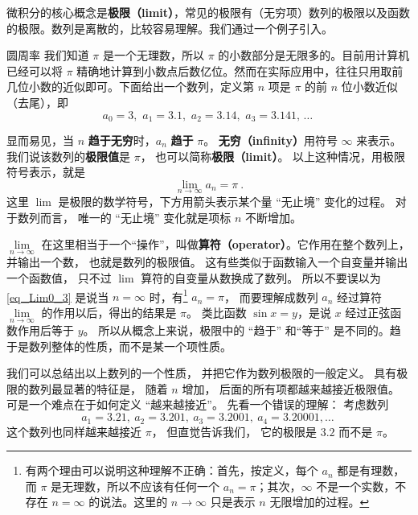 
微积分的核心概念是\textbf{极限（limit）}，常见的极限有（无穷项）数列的极限以及函数的极限。数列是离散的，比较容易理解。我们通过一个例子引入。

\begin{example}{圆周率}\label{ex_Lim0_1}
我们知道 $\pi$ 是一个无理数，所以 $\pi$ 的小数部分是无限多的。目前用计算机已经可以将 $\pi$ 精确地计算到小数点后数亿位。然而在实际应用中，往往只用取前几位小数的近似即可。下面给出一个数列，定义第 $n$ 项是 $\pi$ 的前 $n$ 位小数近似（去尾），即
\begin{equation}\label{eq_Lim0_1}
a_0 = 3,\,\, a_1 = 3.1,\,\, a_2 = 3.14,\,\, a_3 = 3.141,\,\dots~
\end{equation}

显而易见，当 $n$ \textbf{趋于无穷}时，$a_n$ \textbf{趋于} $\pi$。 \textbf{无穷（infinity）}用符号 $\infty$ 来表示。 我们说该数列的\textbf{极限值}是 $\pi$， 也可以简称\textbf{极限（limit）}。 以上这种情况，用极限符号表示，就是
\begin{equation}\label{eq_Lim0_3}
\lim_{n \to \infty } {a_n} = \pi ~.
\end{equation}
这里 $\lim$ 是极限的数学符号，下方用箭头表示某个量 “无止境” 变化的过程。 对于数列而言， 唯一的 “无止境” 变化就是项标 $n$ 不断增加。%
\end{example}

$\lim\limits_{n \to \infty }$ 在这里相当于一个“操作”，叫做\textbf{算符（operator）}。它作用在整个数列上，并输出一个数， 也就是数列的极限值。 这有些类似于函数输入一个自变量并输出一个函数值， 只不过 $\lim$ 算符的自变量从数换成了数列。 所以不要误以为\autoref{eq_Lim0_3} 是说当 $n = \infty$ 时，有\footnote{有两个理由可以说明这种理解不正确：首先，按定义，每个 $a_n$ 都是有理数，而 $\pi$ 是无理数，所以不应该有任何一个 $a_n=\pi$；其次，$\infty$ 不是一个实数，不存在 $n=\infty$ 的说法。这里的 $n\to\infty$ 只是表示 $n$ 无限增加的过程。} $a_n=\pi$， 而要理解成数列 $a_n$ 经过算符 $\lim\limits_{n \to \infty }$ 的作用以后，得出的结果是 $\pi$。 类比函数 $\sin x = y$，是说 $x$ 经过正弦函数作用后等于 $y$。 所以从概念上来说，极限中的 “趋于” 和“等于” 是不同的。趋于是数列整体的性质，而不是某一个项性质。

我们可以总结出以上数列的一个性质， 并把它作为数列极限的一般定义。 具有极限的数列最显著的特征是， 随着 $n$ 增加， 后面的所有项都越来越接近极限值。 可是一个难点在于如何定义 “越来越接近”。 先看一个错误的理解： 考虑数列
\begin{equation}\label{eq_Lim0_2}
a_1 = 3.21,\ a_2 = 3.201,\ a_3 = 3.2001,\ a_4 = 3.20001, \dots~
\end{equation}
这个数列也同样越来越接近 $\pi$， 但直觉告诉我们， 它的极限是 $3.2$ 而不是 $\pi$。

